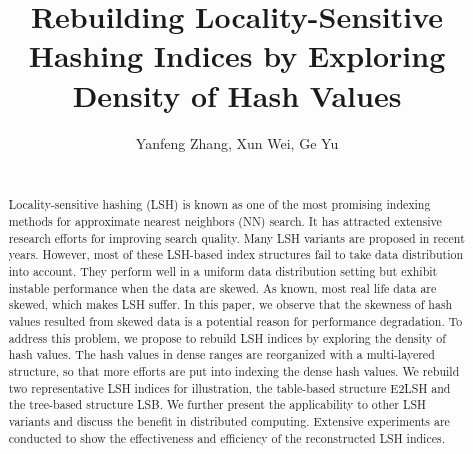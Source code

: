 \documentclass{vldb}
\begin{document}
\newcommand{\Paragraph}[1]{\smallskip{\bf #1.}}
\newcommand{\Paragraphnopunc}[1]{\smallskip\noindent{\bf #1}}
\newcommand{\Paragraphwithindent}[1]{\smallskip{\bf #1.}}
\newcommand{\tabincell}[2]{\begin{tabular}{@{}#1@{}}#2\end{tabular}}
\newcommand{\argmin}{\text{arg}\,\text{min}}
\newcommand{\argmax}{\text{arg}\,\text{max}}

\newtheorem{definition}{Definition}
\newtheorem{prop}{Proposition}
\newtheorem{lemma}{Lemma}
\newtheorem{theorem}{Theorem}


\title{Rebuilding Locality-Sensitive Hashing Indices by Exploring Density of Hash Values}
\author{
\alignauthor
Yanfeng Zhang, Xun Wei, Ge Yu\\
      \\
}
\date{}
\maketitle

\begin{abstract}
Locality-sensitive hashing (LSH) is known as one of the most promising indexing methods for approximate nearest neighbors (NN) search. It has attracted extensive research efforts for improving search quality. Many LSH variants are proposed in recent years. However, most of these LSH-based index structures fail to take data distribution into account. They perform well in a uniform data distribution setting but exhibit instable performance when the data are skewed. As known, most real life data are skewed, which makes LSH suffer. In this paper, we observe that the skewness of hash values resulted from skewed data is a potential reason for performance degradation. To address this problem, we propose to rebuild LSH indices by exploring the density of hash values. The hash values in dense ranges are reorganized with a multi-layered structure, so that more efforts are put into indexing the dense hash values. We rebuild two representative LSH indices for illustration, the table-based structure E2LSH and the tree-based structure LSB. We further present the applicability to other LSH variants and discuss the benefit in distributed computing. Extensive experiments are conducted to show the effectiveness and efficiency of the reconstructed LSH indices.
\end{abstract}





%











\end{document}
